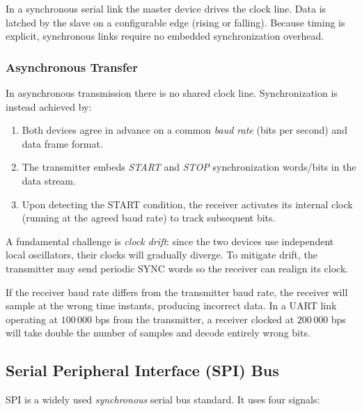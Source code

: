 \documentclass[11pt, a4paper, notitlepage]{report}
\theoremstyle{definition}
\theoremstyle{remark}
\theoremstyle{definition}
\begin{document}
\begin{keyresult}[title={Key Result: Synchronous Serial — Master Provides the Clock}]
  In a synchronous serial link the master device drives the clock line. Data is latched by the slave on a configurable edge (rising or falling). Because timing is explicit, synchronous links require no embedded synchronization overhead.
\end{keyresult}

\subsubsection{Asynchronous Transfer}

In asynchronous transmission there is no shared clock line. Synchronization is instead achieved by:
\begin{enumerate}
  \item Both devices agree in advance on a common \emph{baud rate} (bits per second) and data frame format.
  \item The transmitter embeds \emph{START} and \emph{STOP} synchronization words/bits in the data stream.
  \item Upon detecting the START condition, the receiver activates its internal clock (running at the agreed baud rate) to track subsequent bits.
\end{enumerate}

A fundamental challenge is \emph{clock drift}: since the two devices use independent local oscillators, their clocks will gradually diverge. To mitigate drift, the transmitter may send periodic SYNC words so the receiver can realign its clock.

\begin{warning}[title={Warning: Baud Rate Mismatch Corrupts Data}]
  If the receiver baud rate differs from the transmitter baud rate, the receiver will sample at the wrong time instants, producing incorrect data. In a UART link operating at $100\,000$ bps from the transmitter, a receiver clocked at $200\,000$ bps will take double the number of samples and decode entirely wrong bits.
\end{warning}

\subsection{Serial Peripheral Interface (SPI) Bus}
\label{sec:spi}

SPI is a widely used \emph{synchronous} serial bus standard. It uses four signals:
\end{document}
